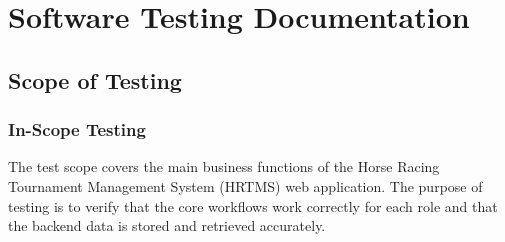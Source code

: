 \chapter{Software Testing Documentation}

\section{Scope of Testing}

\subsection{In-Scope Testing}

The test scope covers the main business functions of the Horse Racing Tournament Management System (HRTMS) web application. The purpose of testing is to verify that the core workflows work correctly for each role and that the backend data is stored and retrieved accurately.

